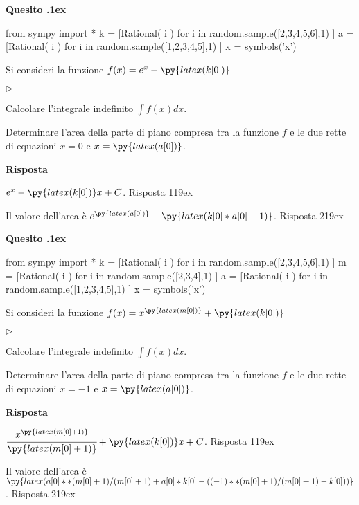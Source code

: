\documentclass[11pt,twoside,a4paper]{article}
\newcommand{\mylabel}[1]{#1\hfill}
\renewenvironment{itemize}
  {\begin{list}{$\triangleright$}{%
   \setlength{\parskip}{0mm}
   \setlength{\topsep}{.4\baselineskip}
   \setlength{\rightmargin}{0mm}
   \setlength{\listparindent}{0mm}
   \setlength{\itemindent}{0mm}
   \setlength{\labelwidth}{2ex}
   \setlength{\itemsep}{.4\baselineskip}
   \setlength{\parsep}{0mm}
   \setlength{\partopsep}{0mm}
   \setlength{\labelsep}{1ex}
   \setlength{\leftmargin}{\labelwidth+\labelsep}
   \let\makelabel\mylabel}}{%
   \end{list}\vspace*{-1.3mm}}
\newcounter{quesito}
\newenvironment{question}{\bigskip\addtocounter{quesito}{1}\bigskip\bigskip\par\textbf{Quesito \thequesito.\kern1ex}}{\vspace{\parskip}}
\newenvironment{answer}{\par\textbf{Risposta\quad}}{\vspace{\parskip}}
\begin{document}
\begin{question}
\begin{pycode}
from sympy import *
k = [Rational( i ) for i in random.sample([2,3,4,5,6],1) ]
a = [Rational( i ) for i in random.sample([1,2,3,4,5],1) ]
x = symbols('x')
\end{pycode}
Si consideri la funzione $f(x) = e^x - \py{latex(k[0])}$
\begin{itemize}
\item[1.] Calcolare l'integrale indefinito $\displaystyle \int f(x) dx$.
\item[2.] Determinare l'area della parte di piano compresa tra la funzione $f$ e le due rette di equazioni $x = 0$ e $x = \py{latex(a[0])}$.
\end{itemize}
\begin{answer}

{\color{blue} $e^x - \py{latex(k[0])} x + C$. 
\hfill Risposta 1\kern19ex}

\smallskip
{\color{blue} Il valore dell'area è $e^{\py{latex(a[0])}} - \py{latex(k[0]*a[0]-1)}$.
\hfill Risposta 2\kern19ex}

\end{answer}
\end{question}
\begin{question}
\begin{pycode}
from sympy import *
k = [Rational( i ) for i in random.sample([2,3,4,5,6],1) ]
m = [Rational( i ) for i in random.sample([2,3,4],1) ]
a = [Rational( i ) for i in random.sample([1,2,3,4,5],1) ]
x = symbols('x')
\end{pycode}
Si consideri la funzione $f(x) = x^{\py{latex(m[0])}} + \py{latex(k[0])}$
\begin{itemize}
\item[1.] Calcolare l'integrale indefinito $\displaystyle \int f(x) dx$.
\item[2.] Determinare l'area della parte di piano compresa tra la funzione $f$ e le due rette di equazioni $x = -1$ e $x = \py{latex(a[0])}$.
\end{itemize}
\begin{answer}

{\color{blue} $\cfrac{x^{\py{latex(m[0]+1)}}}{\py{latex(m[0]+1)}} + \py{latex(k[0])}x + C$. 
\hfill Risposta 1\kern19ex}

\smallskip
{\color{blue} Il valore dell'area è $\py{latex(a[0]**(m[0]+1)/(m[0]+1)+a[0]*k[0] - ((-1)**(m[0]+1)/(m[0]+1)-k[0]))}$.
\hfill Risposta 2\kern19ex}

\end{answer}
\end{question}
\end{document}
